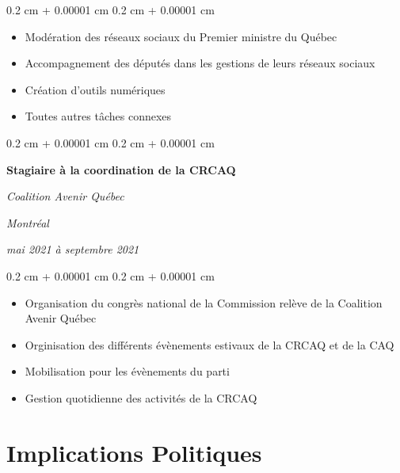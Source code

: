 \documentclass[10pt, letterpaper]{article}
\newenvironment{highlights}{
    \begin{itemize}[
        topsep=0.10 cm,
        parsep=0.10 cm,
        partopsep=0pt,
        itemsep=0pt,
        leftmargin=0.4 cm + 10pt
    ]
}{
    \end{itemize}
} %
\newenvironment{onecolentry}{
    \begin{adjustwidth}{
        0.2 cm + 0.00001 cm
    }{
        0.2 cm + 0.00001 cm
    }
}{
    \end{adjustwidth}
} %
\newenvironment{twocolentry}[2][]{
    \onecolentry
    \def\secondColumn{#2}
    \setcolumnwidth{\fill, 4.5 cm}
    \begin{paracol}{2}
}{
    \switchcolumn \raggedleft \secondColumn
    \end{paracol}
    \endonecolentry
} %
\begin{document}
        \vspace{0.10 cm}
        \begin{onecolentry}
            \begin{highlights}
                \item Modération des réseaux sociaux du Premier ministre du Québec
                \item Accompagnement des députés dans les gestions de leurs réseaux sociaux 
                \item Création d'outils numériques 
                \item Toutes autres tâches connexes
            \end{highlights}
        \end{onecolentry}

 \vspace{0.2 cm}

        \begin{twocolentry}{
        \textit{Montréal}    
            
        \textit{mai 2021 à septembre 2021}}
            \textbf{Stagiaire à la coordination de la CRCAQ}
            
            \textit{Coalition Avenir Québec}
        \end{twocolentry}

        \vspace{0.10 cm}
        \begin{onecolentry}
            \begin{highlights}
                \item Organisation du congrès national de la Commission relève de la Coalition Avenir Québec
                \item Orginisation des différents évènements estivaux de la CRCAQ et de la CAQ
                \item Mobilisation pour les évènements du parti
                \item Gestion quotidienne des activités de la CRCAQ
            \end{highlights}
        \end{onecolentry}

    
    \section{Implications Politiques }
    
\end{document}
